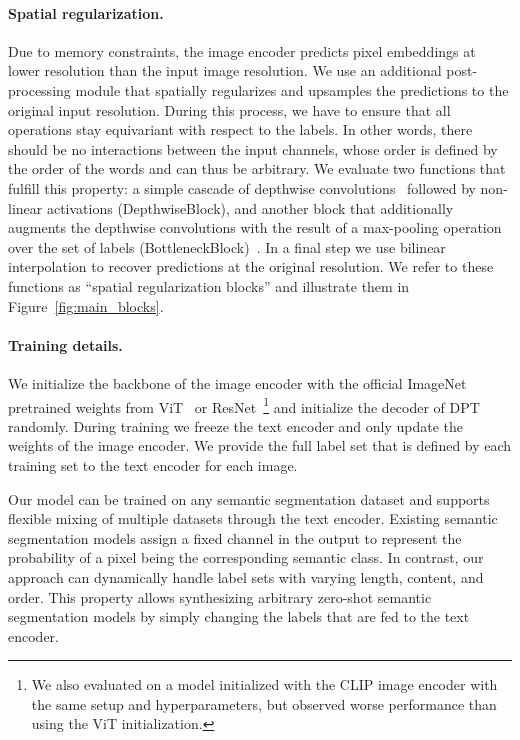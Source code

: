 \paragraph{Spatial regularization.}
Due to memory constraints, the image encoder predicts pixel embeddings at lower resolution than the input image resolution. We use
an additional post-processing module that spatially regularizes and upsamples the predictions to the original input resolution. 
During this process, we have to ensure that all operations stay equivariant with respect to the labels. In other words, there should be no interactions between the input channels, whose order is defined by the order of the words and can thus be arbitrary. We evaluate two functions that fulfill this property: a simple cascade of depthwise convolutions~\citep{chollet2017xception} followed by non-linear activations (DepthwiseBlock), and another block that additionally augments the depthwise convolutions with the result of a max-pooling operation over the set of labels (BottleneckBlock)~\citep{li2019positional}. In a final step we use bilinear interpolation to recover predictions at the original resolution. We refer to these functions as ``spatial regularization blocks'' and illustrate them in Figure~\ref{fig:main_blocks}.



\paragraph{Training details.}
We initialize the backbone of the image encoder with the official ImageNet pretrained weights from ViT~\citep{dosovitskiy2020image} or ResNet~\citep{he2016deep}\footnote{We also evaluated on a model initialized with the CLIP image encoder with the same setup and hyperparameters, but observed worse performance than using the ViT initialization.} and initialize the decoder of DPT randomly. During training we freeze the text encoder and only update the weights of the image encoder. We provide the full label set that is defined by each training set to the text encoder for each image. 


Our model can be trained on any semantic segmentation dataset and supports flexible mixing of multiple datasets through the text encoder.
Existing semantic segmentation models assign a fixed channel in the output to represent the probability of a pixel being the corresponding semantic class. In contrast, our approach can dynamically handle label sets with varying length, content, and order. This property
allows synthesizing arbitrary zero-shot semantic segmentation models by simply changing the labels that are fed to the text encoder. 

